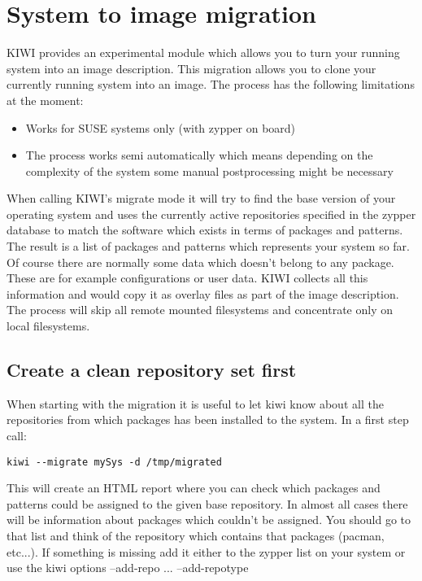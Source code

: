 \chapter{System to image migration}
\label{chapter:migration}
\minitoc

KIWI provides an experimental module which allows you to turn your
running system into an image description. This migration allows you
to clone your currently running system into an image. The process
has the following limitations at the moment:

\begin{itemize}
\item Works for SUSE systems only (with zypper on board)
\item The process works semi automatically which means depending
      on the complexity of the system some manual postprocessing might
      be necessary
\end{itemize}

When calling KIWI's migrate mode it will try to find the base version
of your operating system and uses the currently active repositories
specified in the zypper database to match the software which exists
in terms of packages and patterns. The result is a list of packages
and patterns which represents your system so far. Of course there are
normally some data which doesn't belong to any package. These are
for example configurations or user data. KIWI collects all this
information and would copy it as overlay files as part of the image
description. The process will skip all remote mounted filesystems
and concentrate only on local filesystems.

\section{Create a clean repository set first}
When starting with the migration it is useful to let kiwi know about all
the repositories from which packages has been installed to 
the system. In a first step call:

\begin{Command}{12cm}
\begin{verbatim}
kiwi --migrate mySys -d /tmp/migrated
\end{verbatim}
\end{Command}

This will create an HTML report where you can check which packages and
patterns could be assigned to the given base repository. In almost
all cases there will be information about packages which couldn't
be assigned. You should go to that list and think of the repository
which contains that packages (pacman, etc...). If something is missing
add it either to the zypper list on your system or use the kiwi
options --add-repo ... --add-repotype

